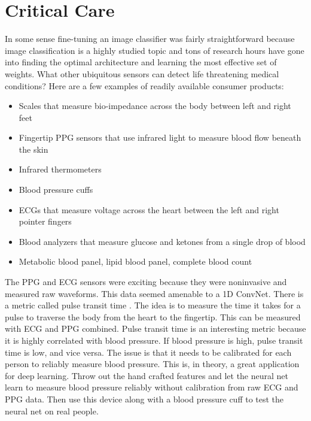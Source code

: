 \section{Critical Care}

In some sense fine-tuning an image classifier was fairly straightforward because image classification is a highly studied topic and tons of research hours have gone into finding the optimal architecture and learning the most effective set of weights.  What other ubiquitous sensors can detect life threatening medical conditions? Here are a few examples of readily available consumer products:

\begin{itemize}
    \item Scales that measure bio-impedance across the body between left and right feet
    \item Fingertip PPG sensors that use infrared light to measure blood flow beneath the skin
    \item Infrared thermometers
    \item Blood pressure cuffs
    \item ECGs that measure voltage across the heart between the left and right pointer fingers
    \item Blood analyzers that measure glucose and ketones from a single drop of blood
    \item Metabolic blood panel, lipid blood panel, complete blood count
\end{itemize}

The PPG and ECG sensors were exciting because they were noninvasive and measured raw waveforms.  This data seemed amenable to a 1D ConvNet.  There is a metric called pulse transit time \cite{geddes1981pulse}.  The idea is to measure the time it takes for a pulse to traverse the body from the heart to the fingertip.  This can be measured with ECG and PPG combined.  Pulse transit time is an interesting metric because it is highly correlated with blood pressure.  If blood pressure is high, pulse transit time is low, and vice versa.  The issue is that it needs to be calibrated for each person to reliably measure blood pressure.  This is, in theory, a great application for deep learning.  Throw out the hand crafted features and let the neural net learn to measure blood pressure reliably without calibration from raw ECG and PPG data.  Then use this device along with a blood pressure cuff to test the neural net on real people.

